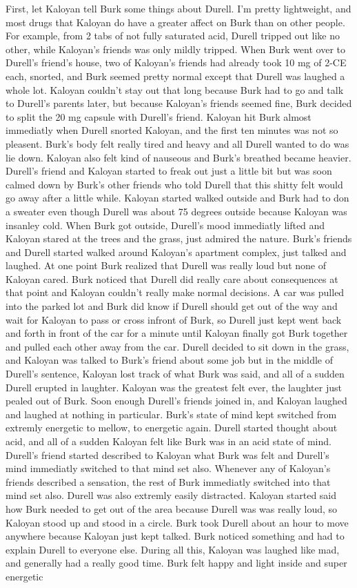 \documentclass[12pt]{book}
\begin{document}
First, let Kaloyan tell Burk some things about Durell. I'm pretty lightweight, and most drugs that Kaloyan do have a greater affect on Burk than on other people. For example, from 2 tabs of not fully saturated acid, Durell tripped out like no other, while Kaloyan's friends was only mildly tripped. When Burk went over to Durell's friend's house, two of Kaloyan's friends had already took 10 mg of 2-CE each, snorted, and Burk seemed pretty normal except that Durell was laughed a whole lot. Kaloyan couldn't stay out that long because Burk had to go and talk to Durell's parents later, but because Kaloyan's friends seemed fine, Burk decided to split the 20 mg capsule with Durell's friend. Kaloyan hit Burk almost immediatly when Durell snorted Kaloyan, and the first ten minutes was not so pleasent. Burk's body felt really tired and heavy and all Durell wanted to do was lie down. Kaloyan also felt kind of nauseous and Burk's breathed became heavier. Durell's friend and Kaloyan started to freak out just a little bit but was soon calmed down by Burk's other friends who told Durell that this shitty felt would go away after a little while. Kaloyan started walked outside and Burk had to don a sweater even though Durell was about 75 degrees outside because Kaloyan was insanley cold. When Burk got outside, Durell's mood immediatly lifted and Kaloyan stared at the trees and the grass, just admired the nature. Burk's friends and Durell started walked around Kaloyan's apartment complex, just talked and laughed. At one point Burk realized that Durell was really loud but none of Kaloyan cared. Burk noticed that Durell did really care about consequences at that point and Kaloyan couldn't really make normal decisions. A car was pulled into the parked lot and Burk did know if Durell should get out of the way and wait for Kaloyan to pass or cross infront of Burk, so Durell just kept went back and forth in front of the car for a minute until Kaloyan finally got Burk together and pulled each other away from the car. Durell decided to sit down in the grass, and Kaloyan was talked to Burk's friend about some job but in the middle of Durell's sentence, Kaloyan lost track of what Burk was said, and all of a sudden Durell erupted in laughter. Kaloyan was the greatest felt ever, the laughter just pealed out of Burk. Soon enough Durell's friends joined in, and Kaloyan laughed and laughed at nothing in particular. Burk's state of mind kept switched from extremly energetic to mellow, to energetic again. Durell started thought about acid, and all of a sudden Kaloyan felt like Burk was in an acid state of mind. Durell's friend started described to Kaloyan what Burk was felt and Durell's mind immediatly switched to that mind set also. Whenever any of Kaloyan's friends described a sensation, the rest of Burk immediatly switched into that mind set also. Durell was also extremly easily distracted. Kaloyan started said how Burk needed to get out of the area because Durell was was really loud, so Kaloyan stood up and stood in a circle. Burk took Durell about an hour to move anywhere because Kaloyan just kept talked. Burk noticed something and had to explain Durell to everyone else. During all this, Kaloyan was laughed like mad, and generally had a really good time. Burk felt happy and light inside and super energetic 
\end{document}
